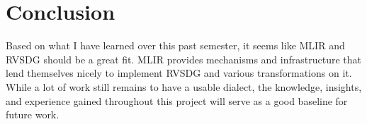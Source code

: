 \section{Conclusion}
Based on what I have learned over this past semester, it seems like MLIR and RVSDG should be a great fit. MLIR provides mechanisms and infrastructure that lend themselves nicely to implement RVSDG and various transformations on it. While a lot of work still remains to have a usable dialect, the knowledge, insights, and experience gained throughout this project will serve as a good baseline for future work.
